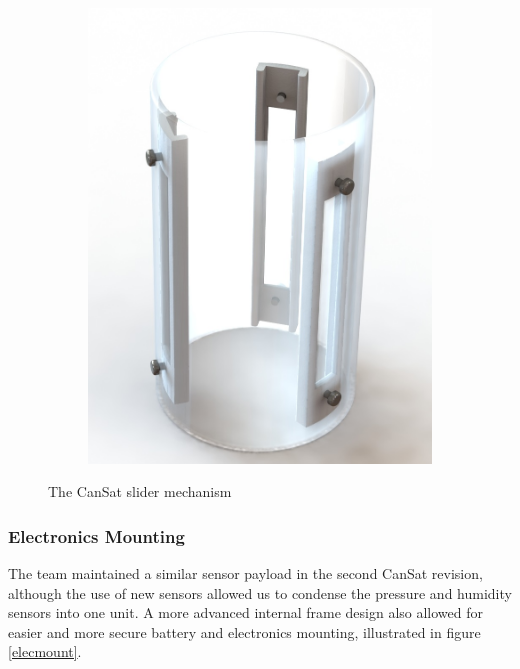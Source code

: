 \documentclass[]{report}
\begin{document}
\begin{figure}
\begin{subfigure}{.5\textwidth}
				\includegraphics[width=0.8\linewidth, angle=0]{Outer_shell_render.jpg}
			\end{subfigure}
			\caption{The CanSat slider mechanism}
			\label{sliders}
		\end{figure}
		
		
		\subsubsection{Electronics Mounting}
		
		The team maintained a similar sensor payload in the second CanSat revision, although the use of new sensors allowed us to condense the pressure and humidity sensors into one unit. A more advanced internal frame design also allowed for easier and more secure battery and electronics mounting, illustrated in figure \ref{elecmount}.
		
\end{document}
